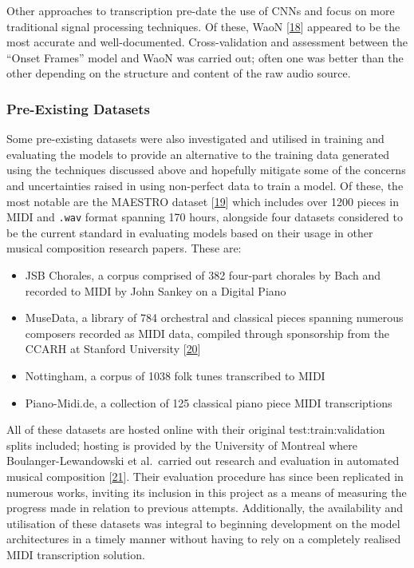 \documentclass[12pt,]{article}
\providecommand{\tightlist}{%
  \setlength{\itemsep}{0pt}\setlength{\parskip}{0pt}}
\begin{document}
Other approaches to transcription pre-date the use of CNNs and focus on
more traditional signal processing techniques. Of these, WaoN
{[}\protect\hyperlink{ref-waon}{18}{]} appeared to be the most accurate
and well-documented. Cross-validation and assessment between the ``Onset
Frames'' model and WaoN was carried out; often one was better than the
other depending on the structure and content of the raw audio source.

\hypertarget{pre-existing-datasets}{%
\subsubsection{Pre-Existing Datasets}\label{pre-existing-datasets}}

Some pre-existing datasets were also investigated and utilised in
training and evaluating the models to provide an alternative to the
training data generated using the techniques discussed above and
hopefully mitigate some of the concerns and uncertainties raised in
using non-perfect data to train a model. Of these, the most notable are
the MAESTRO dataset {[}\protect\hyperlink{ref-maestro2018}{19}{]} which
includes over 1200 pieces in MIDI and \texttt{.wav} format spanning 170
hours, alongside four datasets considered to be the current standard in
evaluating models based on their usage in other musical composition
research papers. These are:

\begin{itemize}
\tightlist
\item
  JSB Chorales, a corpus comprised of 382 four-part chorales by Bach and
  recorded to MIDI by John Sankey on a Digital Piano
\item
  MuseData, a library of 784 orchestral and classical pieces spanning
  numerous composers recorded as MIDI data, compiled through sponsorship
  from the CCARH at Stanford University
  {[}\protect\hyperlink{ref-ccarh}{20}{]}
\item
  Nottingham, a corpus of 1038 folk tunes transcribed to MIDI
\item
  Piano-Midi.de, a collection of 125 classical piano piece MIDI
  transcriptions
\end{itemize}

All of these datasets are hosted online with their original
test:train:validation splits included; hosting is provided by the
University of Montreal where Boulanger-Lewandowski et al.~carried out
research and evaluation in automated musical composition
{[}\protect\hyperlink{ref-boulanger2012modeling}{21}{]}. Their
evaluation procedure has since been replicated in numerous works,
inviting its inclusion in this project as a means of measuring the
progress made in relation to previous attempts. Additionally, the
availability and utilisation of these datasets was integral to beginning
development on the model architectures in a timely manner without having
to rely on a completely realised MIDI transcription solution.
\end{document}
